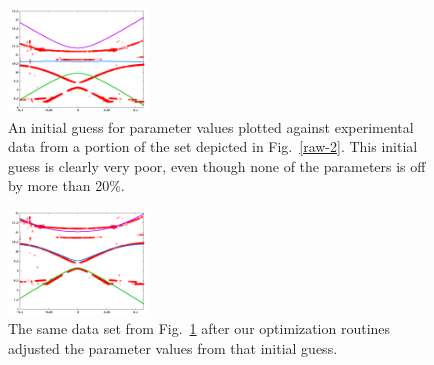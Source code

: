 \documentclass[twocolumn]{revtex4}
\newcommand{\figwidth}{0.33\textwidth}
\begin{document}
\begin{figure}
\includegraphics[width=\figwidth]{CPBL-prefit.png}
\caption{ An initial guess for parameter values plotted against
  experimental data from a portion of the set depicted in
  Fig.~\ref{raw-2}. This initial guess is clearly very poor, even
  though none of the parameters is off by more than 20\%.}
\label{pre-fit}
\end{figure}

\begin{figure}
\includegraphics[width=\figwidth]{CPBL-postfit.png}
\caption{ The same data set from Fig.~\ref{pre-fit} after our
  optimization routines adjusted the parameter values from that
  initial guess.}
\label{post-fit}
\end{figure}
\end{document}
